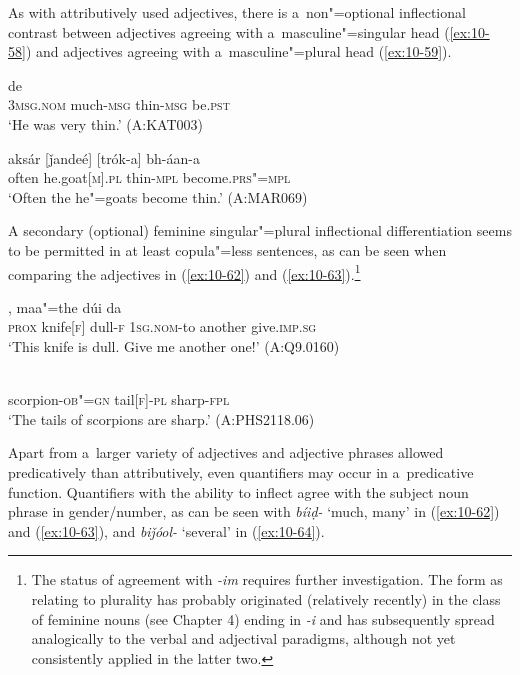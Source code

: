 As with attributively used adjectives, there is a~non"=optional inflectional contrast between adjectives agreeing with a~masculine"=singular head (\ref{ex:10-58}) and adjectives agreeing with a~masculine"=plural head (\ref{ex:10-59}).

\begin{exe}
\ex
\label{ex:10-58}
 de \\
\textsc{3msg.nom} much-\textsc{msg} thin-\textsc{msg} be.\textsc{pst} \\
\glt `He was very thin.' (A:KAT003)

\ex
\label{ex:10-59}
\gll aksár [ǰandeé] [trók-a] bh-áan-a \\
often he.goat[\textsc{m}].\textsc{pl} thin-\textsc{mpl} become.\textsc{prs"=mpl} \\
\glt `Often the he"=goats become thin.' (A:MAR069)
\end{exe}


A secondary (optional) feminine singular"=plural inflectional differentiation seems to be permitted in at least copula"=less sentences, as can be seen when comparing the adjectives in (\ref{ex:10-62}) and (\ref{ex:10-63}).\footnote{The status of agreement with \textit{-im} requires further investigation. The form as relating to plurality has probably originated (relatively recently) in the class of feminine nouns (see Chapter 4) ending in \textit{-i} and has subsequently spread analogically to the verbal and adjectival paradigms, although not yet consistently applied in the latter two.}

\begin{exe}
\ex
\label{ex:10-60}
, maa"=the dúi da \\
\textsc{prox} knife[\textsc{f}] dull-\textsc{f} \textsc{1sg.nom-}to another give.\textsc{imp.sg} \\
\glt `This knife is dull. Give me another one!' (A:Q9.0160)

\ex
\label{ex:10-61}
\gll [ṭíinčuk"=am-i laméeṭi-m] [tíiṇ-im] \\ 
scorpion-\textsc{ob"=gn} tail[\textsc{f}]-\textsc{pl } sharp-\textsc{fpl} \\
\glt `The tails of scorpions are sharp.' (A:PHS2118.06)
\end{exe}

Apart from a~larger variety of adjectives and adjective phrases allowed predicatively than attributively, even quantifiers may occur in a~predicative function. Quantifiers with the ability to inflect agree with the subject noun phrase in gender/number, as can be seen with \textit{bíiḍ-} `much, many' in (\ref{ex:10-62}) and (\ref{ex:10-63}), and \textit{biǰóol-} `several' in (\ref{ex:10-64}).

